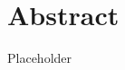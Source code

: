 \documentclass[a4paper, 13pt, oneside]{report}
\begin{document}



\pagebreak

\chapter*{Abstract}
Placeholder
\end{document}
